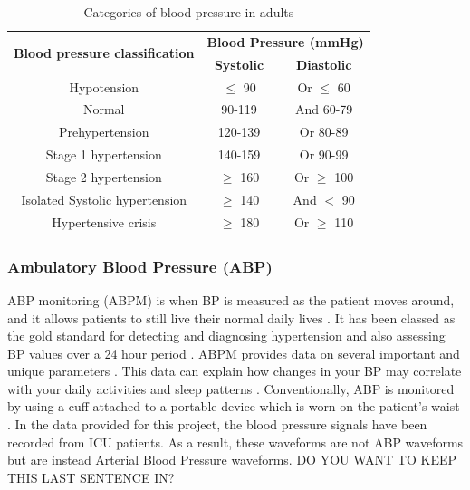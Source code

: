 \begin{table}[H]
    \centering
    \caption{Categories of blood pressure in adults \cite{Wang2018} \cite{Simjanoska20181}}
\begin{tabular}{|c|cc|}
\hline
\multirow{2}{*}{\textbf{Blood pressure classification}} & \multicolumn{2}{c|}{\textbf{Blood Pressure (mmHg)}} \\
 & \textbf{Systolic} & \textbf{Diastolic} \\ \hline
Hypotension & $\le$ 90 & Or $\le$ 60 \\
Normal & 90-119 & And 60-79 \\
Prehypertension & 120-139 & Or 80-89 \\
Stage 1 hypertension & 140-159 & Or 90-99 \\
Stage 2 hypertension & $\ge$ 160 & Or $\ge$ 100 \\ 
Isolated Systolic hypertension & $\ge$ 140 & And $<$ 90\\
Hypertensive crisis & $\ge$ 180 & Or $\ge$ 110 \\ \hline
\end{tabular}
\label{bp_vals_table}
\end{table}

\subsubsection{Ambulatory Blood Pressure (ABP)}
ABP monitoring (ABPM) is when BP is measured as the patient moves around, and it allows 
patients to still live their normal daily lives \cite{Huang2021}. It has been 
classed as the gold standard for detecting and diagnosing hypertension and 
also assessing BP values over a 24 hour period \cite{Kario2021}. ABPM provides 
data on several important and unique parameters \cite{Kario2021}. This data can
 explain how changes in your BP may correlate with your daily activities and sleep 
 patterns \cite{Huang2021}. Conventionally,  ABP is monitored by using a cuff 
 attached to a portable device which is worn on the patient's 
 waist \cite{Kario2021}. In the data provided for this project, the blood pressure signals 
 have been recorded from ICU patients. As a result, these waveforms are not ABP waveforms but are 
 instead Arterial Blood Pressure waveforms. DO YOU WANT TO KEEP THIS LAST SENTENCE IN?


